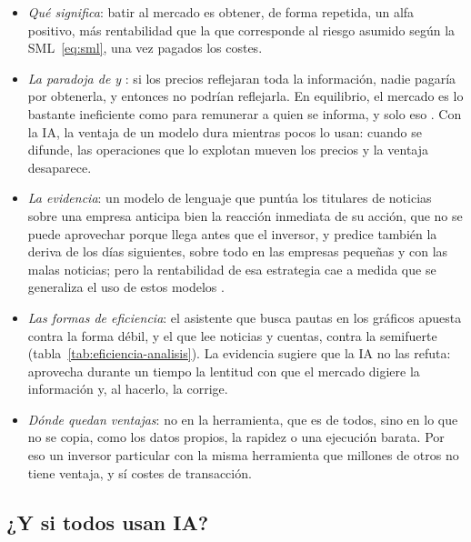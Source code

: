 \documentclass[11pt]{article}
\begin{document}
\begin{itemize}
\item \emph{Qué significa}: batir al mercado es obtener, de forma repetida, un alfa positivo, más rentabilidad que la que corresponde al riesgo asumido según la SML~\eqref{eq:sml}, una vez pagados los costes.
\item \emph{La paradoja de  y }: si los precios reflejaran toda la información, nadie pagaría por obtenerla, y entonces no podrían reflejarla. En equilibrio, el mercado es lo bastante ineficiente como para remunerar a quien se informa, y solo eso \parencite{GrossmanStiglitz1980}. Con la IA, la ventaja de un modelo dura mientras pocos lo usan: cuando se difunde, las operaciones que lo explotan mueven los precios y la ventaja desaparece.
\item \emph{La evidencia}: un modelo de lenguaje que puntúa los titulares de noticias sobre una empresa anticipa bien la reacción inmediata de su acción, que no se puede aprovechar porque llega antes que el inversor, y predice también la deriva de los días siguientes, sobre todo en las empresas pequeñas y con las malas noticias; pero la rentabilidad de esa estrategia cae a medida que se generaliza el uso de estos modelos \parencite{LopezLiraTang2025Can}.
\item \emph{Las formas de eficiencia}: el asistente que busca pautas en los gráficos apuesta contra la forma débil, y el que lee noticias y cuentas, contra la semifuerte (tabla~\ref{tab:eficiencia-analisis}). La evidencia sugiere que la IA no las refuta: aprovecha durante un tiempo la lentitud con que el mercado digiere la información y, al hacerlo, la corrige.
\item \emph{Dónde quedan ventajas}: no en la herramienta, que es de todos, sino en lo que no se copia, como los datos propios, la rapidez o una ejecución barata. Por eso un inversor particular con la misma herramienta que millones de otros no tiene ventaja, y sí costes de transacción.
\end{itemize}

\subsection{¿Y si todos usan IA?}
\end{document}
